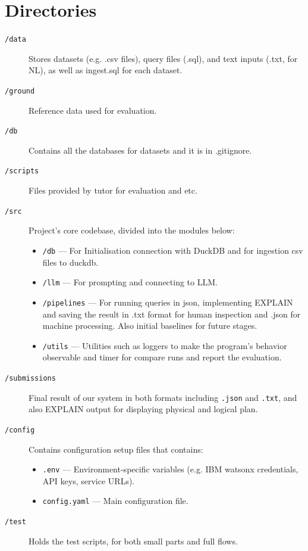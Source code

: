 \documentclass[11pt,a4paper]{article}
\begin{document}
\section{ Directories}

\begin{description}

  \item[\texttt{/data}]%
Stores datasets (e.g. .csv files), query files (.sql), and text inputs (.txt, for NL), as well as ingest.sql for each dataset. 
  
  \item[\texttt{/ground}]%
Reference data used for evaluation.

  \item[\texttt{/db}]%
Contains all the databases for datasets and it is in .gitignore.

  \item[\texttt{/scripts}]%
Files provided by tutor for evaluation and etc.

\item[\texttt{/src}]%
Project’s core codebase, divided into the modules below:
  \begin{itemize}
    \item \texttt{/db} — For Initialisation connection with DuckDB and for ingestion csv files to duckdb.
    \item \texttt{/llm} — For prompting and connecting to LLM.
    \item \texttt{/pipelines} — For running queries in json, implementing EXPLAIN and saving the result in .txt format for human inspection and .json for machine processing. Also initial baselines for future stages.
    \item \texttt{/utils} — Utilities such as loggers to make the program’s behavior observable and timer for compare runs and report the evaluation.
  \end{itemize}

\item[\texttt{/submissions}]%
Final result of our system in both formats including \texttt{.json} and \texttt{.txt}, and also EXPLAIN output for displaying physical and logical plan.

  \item[\texttt{/config}]%
  Contains configuration setup files that contains:
  \begin{itemize}
    \item \texttt{.env} — Environment-specific variables (e.g. IBM watsonx credentials, API keys, service URLs).
    \item \texttt{config.yaml} — Main configuration file.
  \end{itemize}

 \item[\texttt{/test}]%
Holds the test scripts, for both small parts and full flows.

\end{description}
\end{document}
